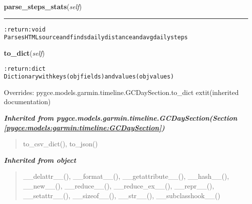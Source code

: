     \vspace{0.5ex}

\hspace{.8\funcindent}\begin{boxedminipage}{\funcwidth}

    \raggedright \textbf{parse\_steps\_stats}(\textit{self})

    \vspace{-1.5ex}

    \rule{\textwidth}{0.5\fboxrule}
\setlength{\parskip}{2ex}
\begin{alltt}

:return: void
    Parses HTML source and finds daily distance and avg daily steps
\end{alltt}

\setlength{\parskip}{1ex}
    \end{boxedminipage}

    \vspace{0.5ex}

\hspace{.8\funcindent}\begin{boxedminipage}{\funcwidth}

    \raggedright \textbf{to\_dict}(\textit{self})

\setlength{\parskip}{2ex}
\begin{alltt}

:return: dict
    Dictionary with keys (obj fields) and values (obj values)
\end{alltt}

\setlength{\parskip}{1ex}
      Overrides: pygce.models.garmin.timeline.GCDaySection.to\_dict 	extit{(inherited documentation)}

    \end{boxedminipage}


\large{\textbf{\textit{Inherited from pygce.models.garmin.timeline.GCDaySection\textit{(Section \ref{pygce:models:garmin:timeline:GCDaySection})}}}}

\begin{quote}
to\_csv\_dict(), to\_json()
\end{quote}

\large{\textbf{\textit{Inherited from object}}}

\begin{quote}
\_\_delattr\_\_(), \_\_format\_\_(), \_\_getattribute\_\_(), \_\_hash\_\_(), \_\_new\_\_(), \_\_reduce\_\_(), \_\_reduce\_ex\_\_(), \_\_repr\_\_(), \_\_setattr\_\_(), \_\_sizeof\_\_(), \_\_str\_\_(), \_\_subclasshook\_\_()
\end{quote}


